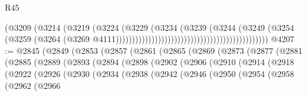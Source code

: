 \begin{lexlean}{R45}
\begin{coremodule}
{                                                                        (@3209
                                                                          (@3214
                                                                            (@3219
                                                                              (@3224
                                                                                (@3229
                                                                                  (@3234
                                                                                    (@3239
                                                                                      (@3244
                                                                                        (@3249
                                                                                          (@3254
                                                                                            (@3259
                                                                                              (@3264
                                                                                                (@3269
                                                                                                  @4111)))))))))))))))))))))))))))))))))))))))))))))))
@4207 := @2845
    (@2849
      (@2853
        (@2857
          (@2861
            (@2865
              (@2869
                (@2873
                  (@2877
                    (@2881
                      (@2885
                        (@2889
                          (@2893
                            (@2894
                              (@2898
                                (@2902
                                  (@2906
                                    (@2910
                                      (@2914
                                        (@2918
                                          (@2922
                                            (@2926
                                              (@2930
                                                (@2934
                                                  (@2938
                                                    (@2942
                                                      (@2946
                                                        (@2950
                                                          (@2954
                                                            (@2958
                                                              (@2962
                                                                (@2966
}
\end{coremodule}
\end{lexlean}
